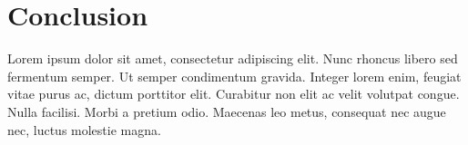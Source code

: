 \section{Conclusion}
\label{sec:conclusion}

Lorem ipsum dolor sit amet, consectetur adipiscing elit. Nunc rhoncus libero sed fermentum semper. Ut semper condimentum gravida. Integer lorem enim, feugiat vitae purus ac, dictum porttitor elit. Curabitur non elit ac velit volutpat congue. Nulla facilisi. Morbi a pretium odio. Maecenas leo metus, consequat nec augue nec, luctus molestie magna.
